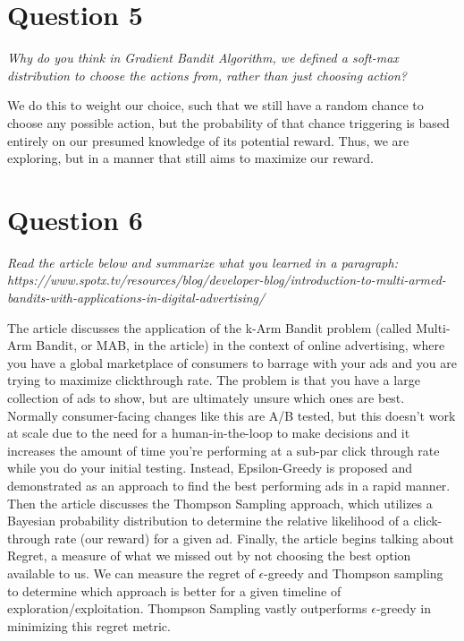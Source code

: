 \documentclass{article}
\begin{document}
\section*{Question 5}

\textit{Why do you think in Gradient Bandit Algorithm, we defined a soft-max distribution to choose the actions from, rather than just choosing action?}

We do this to weight our choice, such that we still have a random chance to choose any possible action, but the probability of that chance triggering is based entirely on our presumed knowledge of its potential reward. Thus, we are exploring, but in a manner that still aims to maximize our reward.

\section*{Question 6}

\textit{Read the article below and summarize what you learned in a paragraph: https://www.spotx.tv/resources/blog/developer-blog/introduction-to-multi-armed-bandits-with-applications-in-digital-advertising/}

The article discusses the application of the k-Arm Bandit problem (called Multi-Arm Bandit, or MAB, in the article) in the context of online advertising, where you have a global marketplace of consumers to barrage with your ads and you are trying to maximize clickthrough rate. The problem is that you have a large collection of ads to show, but are ultimately unsure which ones are best. Normally consumer-facing changes like this are A/B tested, but this doesn't work at scale due to the need for a human-in-the-loop to make decisions and it increases the amount of time you're performing at a sub-par click through rate while you do your initial testing. Instead, Epsilon-Greedy is proposed and demonstrated as an approach to find the best performing ads in a rapid manner. Then the article discusses the Thompson Sampling approach, which utilizes a Bayesian probability distribution to determine the relative likelihood of a click-through rate (our reward) for a given ad. Finally, the article begins talking about Regret, a measure of what we missed out by not choosing the best option available to us. We can measure the regret of $\epsilon$-greedy and Thompson sampling to determine which approach is better for a given timeline of exploration/exploitation. Thompson Sampling vastly outperforms $\epsilon$-greedy in minimizing this regret metric.
\end{document}
